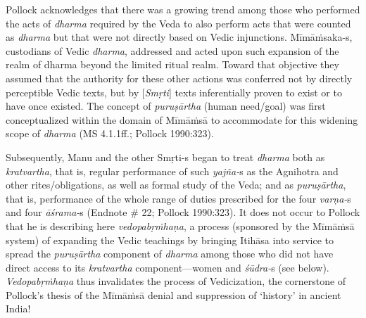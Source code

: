 Pollock acknowledges that there was a growing trend among those who performed the acts of \textit{dharma} required by the Veda to also perform acts that were counted as \textit{dharma} but that were not directly based on Vedic injunctions. Mīmāṁsaka-s, custodians of Vedic \textit{dharma}, addressed and acted upon such expansion of the realm of dharma beyond the limited ritual realm. Toward that objective they assumed that the authority for these other actions was conferred not by directly perceptible Vedic texts, but by [\textit{Smṛti}] texts inferentially proven to exist or to have once existed. The concept of \textit{puruṣārtha} (human need/goal) was first conceptualized within the domain of Mīmāṁsā to accommodate for this widening scope of \textit{dharma} (MS 4.1.1ff.; Pollock 1990:323).

Subsequently, Manu and the other Smṛti-s began to treat \textit{dharma} both as \textit{kratvartha}, that is, regular performance of such \textit{yajña-}s as the Agnihotra and other rites/obligations, as well as formal study of the Veda; and as \textit{puruṣārtha}, that is, performance of the whole range of duties prescribed for the four \textit{varṇa-}s and four \textit{āśrama-}s (Endnote \# 22; Pollock 1990:323). It does not occur to Pollock that he is describing here \textit{vedopabṛṁhaṇa}, a process (sponsored by the Mīmāṁsā system) of expanding the Vedic teachings by bringing Itihāsa into service to spread the \textit{puruṣārtha} component of \textit{dharma} among those who did not have direct access to its \textit{kratvartha} component—women and \textit{śūdra-}s (see below). \textit{Vedopabṛṁhaṇa} thus invalidates the process of Vedicization, the cornerstone of Pollock’s thesis of the Mīmāṁsā denial and suppression of ‘history’ in ancient India! 

